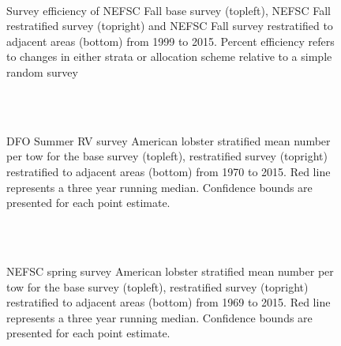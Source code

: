 \documentclass[11pt]{article}
\newcommand{\e}{/backup/bio_data/bio.lobster/figures/} %
\begin{document}
\begin{figure}
\centering
{}
\\
\caption{Survey efficiency of NEFSC Fall base survey (topleft), NEFSC Fall restratified survey (topright) and NEFSC Fall survey restratified to adjacent areas (bottom) from 1999 to 2015. Percent efficiency refers to changes in either strata or allocation scheme relative to a simple random survey }
\end{figure}
\clearpage

\begin{figure}
\centering
{}
\\
\\

\caption{DFO Summer RV survey American lobster stratified mean number per tow for the base survey (topleft), restratified survey (topright) restratified to adjacent areas (bottom) from 1970 to 2015. Red line represents a three year running median. Confidence bounds are presented for each point estimate. }
\end{figure}
\clearpage

\begin{figure}
\centering
{}
\\
\\

\caption{NEFSC spring survey American lobster stratified mean number per tow for the base survey (topleft), restratified survey (topright) restratified to adjacent areas (bottom) from 1969 to 2015. Red line represents a three year running median. Confidence bounds are presented for each point estimate. }
\end{figure}
\clearpage
\end{document}
